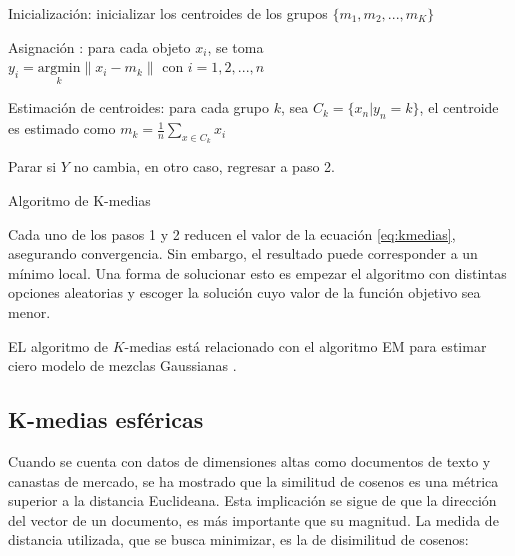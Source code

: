 \ssp
\begin{algorithm}
  \SetAlgoNoLine
  \DontPrintSemicolon

  Inicialización: inicializar los centroides de los grupos  $\{m_{1},m_{2},...,m_{K}\}$
  
  Asignación : para cada objeto $x_{i}$, se toma \\ $y_{i}=\underset{k}{\textrm{argmin}} \| x_{i}-m_{k} \| $ con $i = 1,2,...,n$
 
  Estimación de centroides: para cada grupo $k$, sea $C_{k}=\{x_{n} | y_{n}=k\}$, el centroide es estimado como $m_{k}=\frac{1}{n} \sum_{x \in C_{k}} x_{i} $
  
  Parar si $Y$ no cambia, en otro caso, regresar a paso 2.

  \caption{Algoritmo de K-medias\label{Kmedias}}
\end{algorithm}
\dsp
Cada uno de los pasos 1 y 2 reducen el valor de la ecuación \ref{eq:kmedias}, asegurando convergencia. Sin embargo, el resultado puede corresponder a un mínimo local. Una forma de solucionar esto es empezar el algoritmo con distintas opciones aleatorias y escoger la solución cuyo valor de la función objetivo sea menor.

EL algoritmo de $K$-medias está relacionado con el algoritmo EM para estimar ciero modelo de mezclas Gaussianas \citep{hastie09}. 
 

\subsection{K-medias esféricas}
Cuando se cuenta con datos de dimensiones altas como documentos de texto  y canastas de mercado, se ha mostrado que la similitud de cosenos es una métrica superior a la distancia Euclideana. Esta implicación se sigue de que la dirección del vector de un documento, es más importante que su magnitud. La medida de distancia utilizada, que se busca minimizar,  es la de disimilitud de cosenos:

